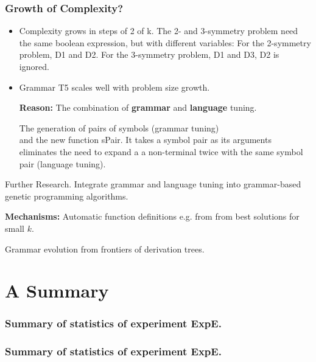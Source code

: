 \documentclass[18pt,c]{beamer}
\makeatletter
\let\beamer@writeslidentry@miniframeson=\beamer@writeslidentry
\newcommand*{\miniframeson}{\let\beamer@writeslidentry=\beamer@writeslidentry@miniframeson}
\makeatother
\begin{document}
\begin{frame}
\frametitle{
Growth of Complexity?
}
\begin{itemize}
\item Complexity grows in steps of 2 of k.
       The 2- and 3-symmetry problem need the same boolean expression,
       but with different variables:
       For the 2-symmetry problem, D1 and D2.
       For the 3-symmetry problem, D1 and D3,
       D2 is ignored.
\item Grammar T5 scales well with problem size growth.
 
  {\bf Reason:} The combination of {\bf grammar} and
        {\bf language} tuning.
 
The generation of pairs of symbols
                 (grammar tuning) \\
  and the new function sPair. It takes a 
  symbol pair as its arguments eliminates the need to expand a 
  a non-terminal twice with the same symbol pair
  (language tuning).
\end{itemize}
\end{frame}%
\begin{frame}
\vspace*{2mm}
\begin{block}{
Further Research.
}
Integrate grammar and language tuning
into grammar-based genetic programming algorithms.
  
{\bf Mechanisms:}
Automatic function definitions e.g. from from best solutions for small $k$.
 
Grammar evolution from frontiers of derivation trees.
\end{block}
\end{frame}%
\miniframeson
\section{A Summary}
 \begin{frame}
 \fontsize{8pt}{9pt}\selectfont
 \frametitle{ Summary of statistics of experiment ExpE. }

 \label{ExpEStatsTable000.tex}  
 \end{frame}

 \begin{frame}
 \fontsize{8pt}{9pt}\selectfont
 \frametitle{ Summary of statistics of experiment ExpE. }

 \label{ExpEStatsTable001.tex}  
 \end{frame}
\end{document}

